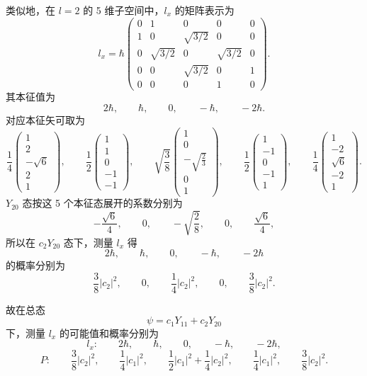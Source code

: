 \documentclass[12pt,a4paper]{article}
\begin{document}
\begin{enumerate}[label=(\alph*)]
    类似地，在 \(l=2\) 的 5 维子空间中，\(l_{x}\) 的矩阵表示为
    \[
    l_{x}
    =
    \hbar
    \begin{pmatrix}
    0 & 1 & 0 & 0 & 0 \\
    1 & 0 & \sqrt{3/2} & 0 & 0 \\
    0 & \sqrt{3/2} & 0 & \sqrt{3/2} & 0 \\
    0 & 0 & \sqrt{3/2} & 0 & 1 \\
    0 & 0 & 0 & 1 & 0
    \end{pmatrix}.
    \]
    其本征值为
    \[
    2\hbar,\qquad \hbar,\qquad 0,\qquad -\hbar,\qquad -2\hbar.
    \]
    对应本征矢可取为
    \[
    \frac{1}{4}
    \begin{pmatrix}
    1\\ 2\\ -\sqrt{6}\\ 2\\ 1
    \end{pmatrix},
    \qquad
    \frac{1}{2}
    \begin{pmatrix}
    1\\ 1\\0\\ -1\\-1
    \end{pmatrix},
    \qquad
    \sqrt{\frac{3}{8}}
    \begin{pmatrix}
    1\\0\\ -\sqrt{\frac{2}{3}}\\ 0\\1
    \end{pmatrix},
    \qquad
    \frac{1}{2}
    \begin{pmatrix}
    1\\ -1\\0\\ -1\\1
    \end{pmatrix},
    \qquad
    \frac{1}{4}
    \begin{pmatrix}
    1\\ -2\\ \sqrt{6}\\ -2\\ 1
    \end{pmatrix}.
    \]
    \(Y_{20}\) 态按这 5 个本征态展开的系数分别为
    \[
    -\frac{\sqrt{6}}{4},\qquad 0,\qquad -\sqrt{\frac{2}{8}},\qquad 0,\qquad \frac{\sqrt{6}}{4},
    \]
    所以在 \(c_{2}Y_{20}\) 态下，测量 \(l_{x}\) 得
    \[
    2\hbar,\qquad \hbar,\qquad 0,\qquad -\hbar,\qquad -2\hbar
    \]
    的概率分别为
    \[
    \frac{3}{8}|c_{2}|^{2},\qquad
    0,\qquad
    \frac{1}{4}|c_{2}|^{2},\qquad
    0,\qquad
    \frac{3}{8}|c_{2}|^{2}.
    \]

    故在总态
    \[
    \psi=c_{1}Y_{11}+c_{2}Y_{20}
    \]
    下，测量 \(l_{x}\) 的可能值和概率分别为
    \[
    l_{x}:\qquad
    2\hbar,\qquad
    \hbar,\qquad
    0,\qquad
    -\hbar,\qquad
    -2\hbar,
    \]
    \[
    P:\qquad
    \frac{3}{8}|c_{2}|^{2},\qquad
    \frac{1}{4}|c_{1}|^{2},\qquad
    \frac{1}{2}|c_{1}|^{2}+\frac{1}{4}|c_{2}|^{2},\qquad
    \frac{1}{4}|c_{1}|^{2},\qquad
    \frac{3}{8}|c_{2}|^{2}.
    \]
\end{enumerate}

\end{document}
